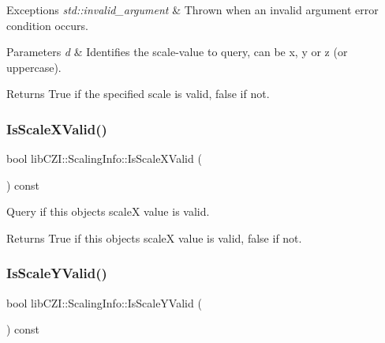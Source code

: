\begin{DoxyExceptions}{Exceptions}
{\em std\+::invalid\+\_\+argument} & Thrown when an invalid argument error condition occurs.\\
\hline
\end{DoxyExceptions}

\begin{DoxyParams}{Parameters}
{\em d} & Identifies the scale-\/value to query, can be \textquotesingle{}x\textquotesingle{}, \textquotesingle{}y\textquotesingle{} or \textquotesingle{}z\textquotesingle{} (or uppercase).\\
\hline
\end{DoxyParams}
\begin{DoxyReturn}{Returns}
True if the specified scale is valid, false if not. 
\end{DoxyReturn}
\mbox{\label{structlib_c_z_i_1_1_scaling_info_acb5dd76b1a44cf4bef44e26ca48c8afe}} 
\subsubsection{\texorpdfstring{Is\+Scale\+X\+Valid()}{IsScaleXValid()}}
{\footnotesize\ttfamily bool lib\+C\+Z\+I\+::\+Scaling\+Info\+::\+Is\+Scale\+X\+Valid (\begin{DoxyParamCaption}{ }\end{DoxyParamCaption}) const\hspace{0.3cm}{\ttfamily [inline]}}

Query if this object\textquotesingle{}s scaleX value is valid.

\begin{DoxyReturn}{Returns}
True if this object\textquotesingle{}s scaleX value is valid, false if not. 
\end{DoxyReturn}
\mbox{\label{structlib_c_z_i_1_1_scaling_info_afa9e1621388bd169ab263671f6c44103}} 
\subsubsection{\texorpdfstring{Is\+Scale\+Y\+Valid()}{IsScaleYValid()}}
{\footnotesize\ttfamily bool lib\+C\+Z\+I\+::\+Scaling\+Info\+::\+Is\+Scale\+Y\+Valid (\begin{DoxyParamCaption}{ }\end{DoxyParamCaption}) const\hspace{0.3cm}{\ttfamily [inline]}}

